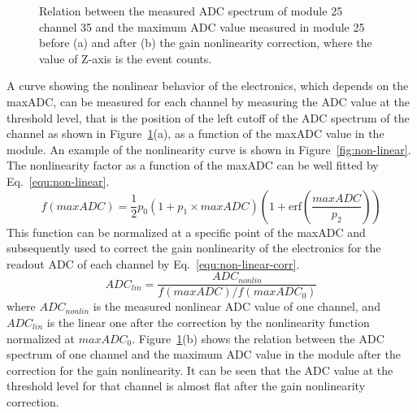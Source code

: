 \documentclass[preprint,sort&compress,12pt]{elsarticle}
\begin{document}
\begin{figure}[!ht]
\centering
{}
\hspace{3mm}
\caption{Relation between the measured ADC spectrum of module 25 channel 35 and the maximum ADC value measured in module 25 before (a) and after (b) the gain nonlinearity correction, where the value of Z-axis is the event counts.}\label{fig:maxADC}
\end{figure}

A curve showing the nonlinear behavior of the electronics, which depends on the maxADC, can be measured for each channel by measuring the ADC value at the threshold level, that is the position of the left cutoff of the ADC spectrum of the channel as shown in Figure~\ref{fig:maxADC}(a), as a function of the maxADC value in the module. An example of the nonlinearity curve is shown in Figure~\ref{fig:non-linear}. The nonlinearity factor as a function of the maxADC can be well fitted by Eq.~\eqref{equ:non-linear}.
\begin{equation}\label{equ:non-linear}
f(maxADC) = \frac{1}{2}p_0\left(1 + p_1 \times maxADC\right) \left(1 + \mathrm{erf}\left(\frac{maxADC}{p_2}\right)\right)
\end{equation}
This function can be normalized at a specific point of the maxADC and subsequently used to correct the gain nonlinearity of the electronics for the readout ADC of each channel by Eq.~\eqref{equ:non-linear-corr}.
\begin{equation}\label{equ:non-linear-corr}
ADC_{lin} = \frac{ADC_{nonlin}}{f(maxADC) / f(maxADC_0)}
\end{equation}
where $ADC_{nonlin}$ is the measured nonlinear ADC value of one channel, and $ADC_{lin}$ is the linear one after the correction by the nonlinearity function normalized at $maxADC_0$. Figure~\ref{fig:maxADC}(b) shows the relation between the ADC spectrum of one channel and the maximum ADC value in the module after the correction for the gain nonlinearity. It can be seen that the ADC value at the threshold level for that channel is almost flat after the gain nonlinearity correction.
\end{document}
